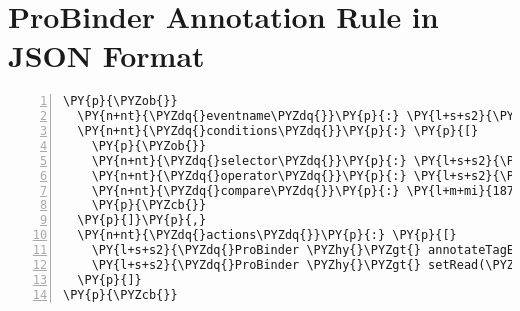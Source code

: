 \section{ProBinder Annotation Rule in JSON Format \label{ruleAnnotation}}
\begin{Verbatim}[samepage=true,frame=single,fontsize=\footnotesize,commandchars=\\\{\},numbers=left,firstnumber=1,stepnumber=1,xleftmargin
=.3in]
\PY{p}{\PYZob{}}
  \PY{n+nt}{\PYZdq{}eventname\PYZdq{}}\PY{p}{:} \PY{l+s+s2}{\PYZdq{}ProBinder \PYZhy{}\PYZgt{} unreadContent\PYZdq{}}\PY{p}{,}
  \PY{n+nt}{\PYZdq{}conditions\PYZdq{}}\PY{p}{:} \PY{p}{[}
    \PY{p}{\PYZob{}}
    \PY{n+nt}{\PYZdq{}selector\PYZdq{}}\PY{p}{:} \PY{l+s+s2}{\PYZdq{}.context .id\PYZdq{}}\PY{p}{,}
    \PY{n+nt}{\PYZdq{}operator\PYZdq{}}\PY{p}{:} \PY{l+s+s2}{\PYZdq{}==\PYZdq{}}\PY{p}{,}
    \PY{n+nt}{\PYZdq{}compare\PYZdq{}}\PY{p}{:} \PY{l+m+mi}{18749}
    \PY{p}{\PYZcb{}}
  \PY{p}{]}\PY{p}{,}
  \PY{n+nt}{\PYZdq{}actions\PYZdq{}}\PY{p}{:} \PY{p}{[}
    \PY{l+s+s2}{\PYZdq{}ProBinder \PYZhy{}\PYZgt{} annotateTagEntries(\PYZbs{}\PYZdq{}\PYZsh{}\PYZob{} .id \PYZcb{}\PYZbs{}\PYZdq{})\PYZdq{}} \PY{p}{,}
    \PY{l+s+s2}{\PYZdq{}ProBinder \PYZhy{}\PYZgt{} setRead(\PYZbs{}\PYZdq{}\PYZsh{}\PYZob{} .id \PYZcb{}\PYZbs{}\PYZdq{})\PYZdq{}}
  \PY{p}{]}
\PY{p}{\PYZcb{}}
\end{Verbatim}





\clearpage
